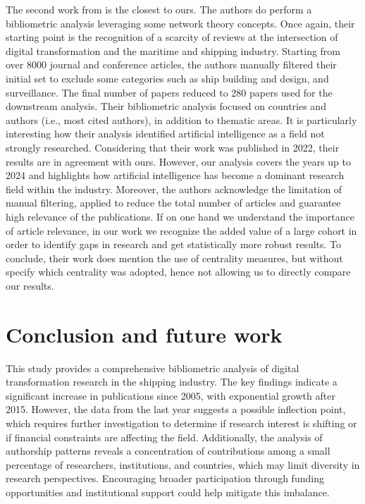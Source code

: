 \documentclass[a4paper, review, endfloat, doubleblind, authoryear]{elsarticle}
\begin{document}
	The second work from \citep{jovic2022digitalization} is the closest to ours. The authors do perform a bibliometric analysis leveraging some network theory concepts. Once again, their starting point is the recognition of a scarcity of reviews at the intersection of digital transformation and the maritime and shipping industry. Starting from over 8000 journal and conference articles, the authors manually filtered their initial set to exclude some categories such as ship building and design, and surveillance. The final number of papers reduced to 280 papers used for the downstream analysis. Their bibliometric analysis focused on countries and authors (i.e., most cited authors), in addition to thematic areas. It is particularly interesting how their analysis identified artificial intelligence as a field not strongly researched. Considering that their work was published in 2022, their results are in agreement with ours. However, our analysis covers the years up to 2024 and highlights how artificial intelligence has become a dominant research field within the industry. Moreover, the authors acknowledge the limitation of manual filtering, applied to reduce the total number of articles and guarantee high relevance of the publications. If on one hand we understand the importance of article relevance, in our work we recognize the added value of a large cohort in order to identify gaps in research and get statistically more robust results. To conclude, their work does mention the use of centrality measures, but without specify which centrality was adopted, hence not allowing us to directly compare our results.	 
	
	\section{Conclusion and future work}
	This study provides a comprehensive bibliometric analysis of digital transformation research in the shipping industry. The key findings indicate a significant increase in publications since 2005, with exponential growth after 2015. However, the data from the last year suggests a possible inflection point, which requires further investigation to determine if research interest is shifting or if financial constraints are affecting the field. Additionally, the analysis of authorship patterns reveals a concentration of contributions among a small percentage of researchers, institutions, and countries, which may limit diversity in research perspectives. Encouraging broader participation through funding opportunities and institutional support could help mitigate this imbalance.
	
\end{document}
